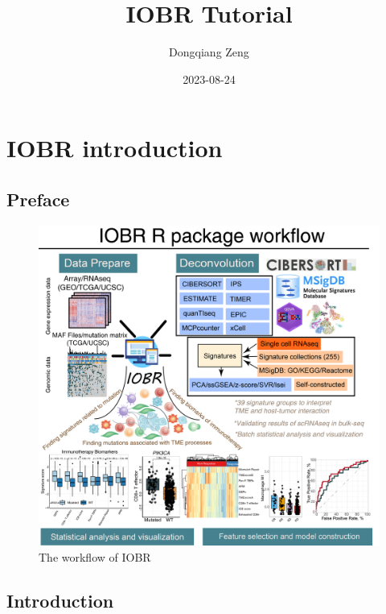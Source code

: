 \documentclass[
  12pt,
]{book}
\title{IOBR Tutorial}
\author{Dongqiang Zeng}
\date{2023-08-24}
\theoremstyle{definition}
\theoremstyle{definition}
\theoremstyle{definition}
\theoremstyle{definition}
\theoremstyle{remark}
\begin{document}
\maketitle

{
\setcounter{tocdepth}{1}
\tableofcontents
}
\hypertarget{iobr-introduction}{%
\chapter*{\texorpdfstring{\textbf{IOBR introduction}}{IOBR introduction}}\label{iobr-introduction}}

\hypertarget{preface}{%
\section*{Preface}\label{preface}}

\begin{figure}

{\centering \includegraphics[width=0.95\linewidth]{./fig/IOBR-Workflow} 

}

\caption{The workflow of IOBR}\label{fig:unnamed-chunk-1}
\end{figure}

\hypertarget{introduction}{%
\section{Introduction}\label{introduction}}
\end{document}
